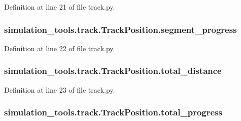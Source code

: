 Definition at line 21 of file track.\+py.

\subsubsection[{\texorpdfstring{segment\+\_\+progress}{segment_progress}}]{\setlength{\rightskip}{0pt plus 5cm}simulation\+\_\+tools.\+track.\+Track\+Position.\+segment\+\_\+progress}\hypertarget{classsimulation__tools_1_1track_1_1_track_position_a1ce2f49333cc2e6d5ac1094a3e919eeb}{}\label{classsimulation__tools_1_1track_1_1_track_position_a1ce2f49333cc2e6d5ac1094a3e919eeb}


Definition at line 22 of file track.\+py.

\subsubsection[{\texorpdfstring{total\+\_\+distance}{total_distance}}]{\setlength{\rightskip}{0pt plus 5cm}simulation\+\_\+tools.\+track.\+Track\+Position.\+total\+\_\+distance}\hypertarget{classsimulation__tools_1_1track_1_1_track_position_a488a7374a672827079686cf7fece12ee}{}\label{classsimulation__tools_1_1track_1_1_track_position_a488a7374a672827079686cf7fece12ee}


Definition at line 23 of file track.\+py.

\subsubsection[{\texorpdfstring{total\+\_\+progress}{total_progress}}]{\setlength{\rightskip}{0pt plus 5cm}simulation\+\_\+tools.\+track.\+Track\+Position.\+total\+\_\+progress}\hypertarget{classsimulation__tools_1_1track_1_1_track_position_a0471b3519ccab2dfd048ed02853f8a8d}{}\label{classsimulation__tools_1_1track_1_1_track_position_a0471b3519ccab2dfd048ed02853f8a8d}


